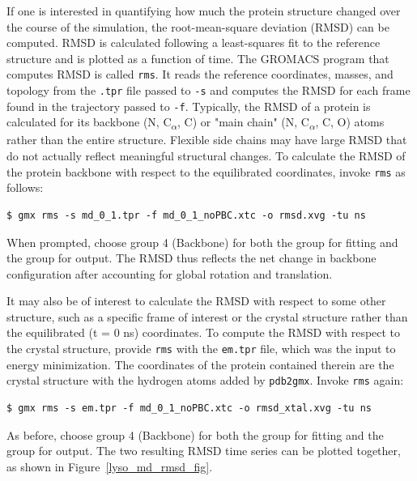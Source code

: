 \documentclass[9pt,tutorial,pubversion]{livecoms}
\begin{document}
If one is interested in quantifying how much the protein structure changed over the course of the simulation, the root-mean-square deviation (RMSD) can be computed. RMSD is calculated following a least-squares fit to the reference structure and is plotted as a function of time. The GROMACS program that computes RMSD is called \texttt{rms}. It reads the reference coordinates, masses, and topology from the \texttt{.tpr} file passed to \texttt{-s} and computes the RMSD for each frame found in the trajectory passed to \texttt{-f}. Typically, the RMSD of a protein is calculated for its backbone (N, C\textsubscript{$\alpha$}, C) or "main chain" (N, C\textsubscript{$\alpha$}, C, O) atoms rather than the entire structure. Flexible side chains may have large RMSD that do not actually reflect meaningful structural changes. To calculate the RMSD of the protein backbone with respect to the equilibrated coordinates, invoke \texttt{rms} as follows:

\begin{lstlisting}
$ gmx rms -s md_0_1.tpr -f md_0_1_noPBC.xtc -o rmsd.xvg -tu ns
\end{lstlisting}
%
When prompted, choose group 4 (Backbone) for both the group for fitting and the group for output. The RMSD thus reflects the net change in backbone configuration after accounting for global rotation and translation.

It may also be of interest to calculate the RMSD with respect to some other structure, such as a specific frame of interest or the crystal structure rather than the equilibrated (t = 0 ns) coordinates. To compute the RMSD with respect to the crystal structure, provide \texttt{rms} with the \texttt{em.tpr} file, which was the input to energy minimization. The coordinates of the protein contained therein are the crystal structure with the hydrogen atoms added by \texttt{pdb2gmx}. Invoke \texttt{rms} again:

\begin{lstlisting}
$ gmx rms -s em.tpr -f md_0_1_noPBC.xtc -o rmsd_xtal.xvg -tu ns
\end{lstlisting}
%
As before, choose group 4 (Backbone) for both the group for fitting and the group for output. The two resulting RMSD time series can be plotted together, as shown in Figure~\ref{lyso_md_rmsd_fig}.
\end{document}
